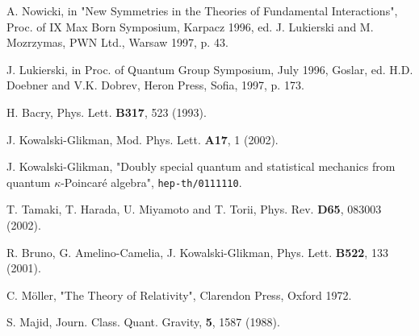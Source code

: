 \documentclass[a4paper,12pt]{article}
\begin{document}
\begin{thebibliography}{99}
A. Nowicki, in "New Symmetries in the Theories of
Fundamental Interactions", Proc. of IX Max Born Symposium, Karpacz
1996, ed. J. Lukierski and M. Mozrzymas, PWN Ltd., Warsaw 1997, p.
43.

J. Lukierski, in Proc. of Quantum Group
Symposium, July 1996, Goslar, ed. H.D. Doebner and V.K. Dobrev,
Heron Press, Sofia, 1997, p. 173.

H. Bacry, Phys. Lett. {\bf B317}, 523 (1993).

J. Kowalski-Glikman, Mod. Phys. Lett. {\bf A17}, 1
(2002).

J. Kowalski-Glikman, "Doubly special quantum and
statistical mechanics from quantum $\kappa$-Poincar\'{e} algebra",
{\tt hep-th/0111110}.

T. Tamaki, T. Harada, U. Miyamoto and T. Torii, Phys. Rev. 
{\bf D65}, 083003 (2002).

R. Bruno, G. Amelino-Camelia, J. Kowalski-Glikman,
Phys. Lett. {\bf B522}, 133 (2001).

C. M\"{o}ller, "The Theory of Relativity", Clarendon
Press, Oxford 1972.

S. Majid, Journ. Class. Quant. Gravity, {\bf 5}, 1587
(1988).



\end{thebibliography}













 
\end{document}
